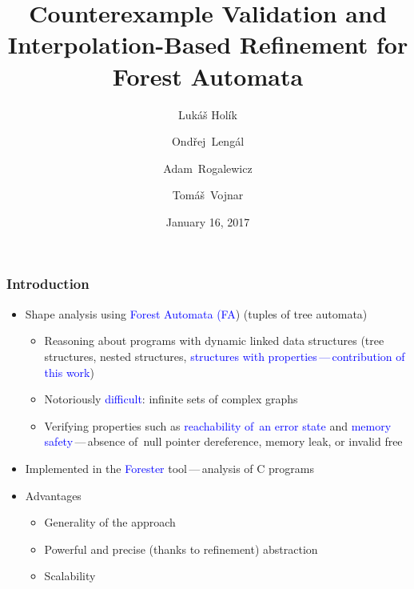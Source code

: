 \documentclass{beamer}
\title{
 Counterexample Validation and Interpolation-Based
Refinement for Forest Automata}
\author[
  Hol\'{i}k \and 
  \textbf{\hlbl{Hru\v{s}ka}} \and
  Leng\'{a}l \and
  Rogalewicz \and
  Vojnar~~~~~]
{
  Luk\'{a}\v{s} Hol\'{i}k \and 
  \hlbl{\textbf{ Martin Hru\v{s}ka}} \and
  Ond\v{r}ej~Leng\'{a}l \and
  Adam~Rogalewicz\\ \and
  Tom\'{a}\v{s}~Vojnar}
\institute[BUT]{Brno University of Technology, Czech Republic\\[6mm]
@VMCAI'17, Paris}
\date{January 16, 2017}
\newcommand{\hlbl}[1]{\textcolor{blue}{#1}}
\newcommand{\hlgr}[1]{\textcolor{olive!50!green}{#1}}
\begin{document}

\begin{frame}[plain]
  \titlepage
\end{frame}

\begin{frame}
  \frametitle{Introduction}
  \begin{itemize}
	  \item Shape analysis using \hlbl{Forest Automata (FA})
		  (tuples of tree automata)
		  \begin{itemize}
			\item Reasoning about programs with dynamic linked data structures
				(tree structures, nested structures, \hlbl{structures with properties\,---\,contribution of this work})
			\item Notoriously \hlbl{difficult}: infinite sets of complex graphs
			\item Verifying properties such as \hlbl{reachability of~an error state} and \hlbl{memory safety}\,---\,absence of~null pointer dereference,
			  memory leak, or invalid free
	  \end{itemize}
	  \pause
	  	  \item Implemented in the \hlbl{Forester} tool\,---\,analysis of C programs
	  \item \hlgr{Advantages}
	   \begin{itemize}
		 \item Generality of the approach
		 \item Powerful and precise (thanks to refinement) abstraction
		 \item Scalability
	   \end{itemize}

  \end{itemize}
\end{frame}
\end{document}

